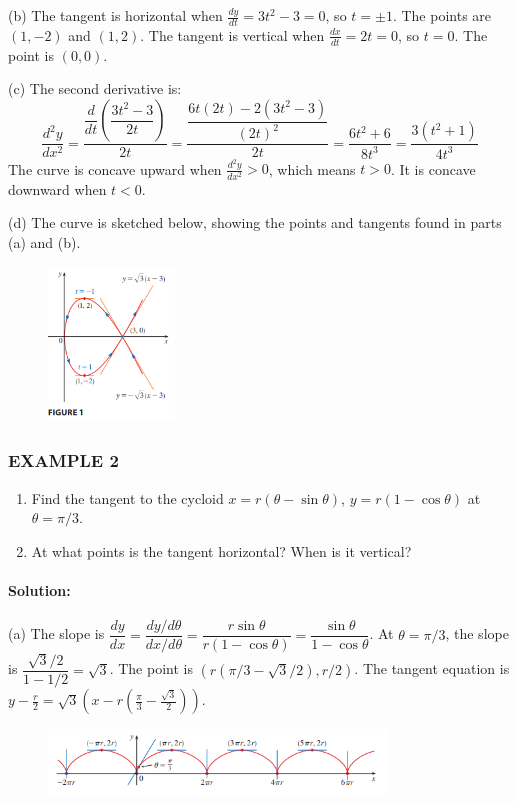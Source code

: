 \documentclass{article}
\begin{document}
(b) The tangent is horizontal when $\frac{dy}{dt} = 3t^2-3 = 0$, so $t=\pm 1$. The points are $(1,-2)$ and $(1,2)$. The tangent is vertical when $\frac{dx}{dt} = 2t = 0$, so $t=0$. The point is $(0,0)$.

(c) The second derivative is:
\[
\frac{d^2y}{dx^2} = \dfrac{\dfrac{d}{dt}\left(\dfrac{3t^2-3}{2t}\right)}{2t} = \frac{\dfrac{6t(2t) - 2(3t^2-3)}{(2t)^2}}{2t} = \frac{6t^2+6}{8t^3} = \frac{3(t^2+1)}{4t^3}
\]
The curve is concave upward when $\frac{d^2y}{dx^2} > 0$, which means $t > 0$. It is concave downward when $t < 0$.

(d) The curve is sketched below, showing the points and tangents found in parts (a) and (b).
\begin{figure}[htbp]
    \centering
    \includegraphics[width=0.3\textwidth]{graph27.png}
\end{figure}

\subsubsection*{EXAMPLE 2}
\begin{enumerate}
    \item[(a)] Find the tangent to the cycloid $x=r(\theta-\sin\theta)$, $y=r(1-\cos\theta)$ at $\theta=\pi/3$.
    \item[(b)] At what points is the tangent horizontal? When is it vertical?
\end{enumerate}
\paragraph{Solution:}
(a) The slope is $\dfrac{dy}{dx} = \dfrac{dy/d\theta}{dx/d\theta} = \dfrac{r\sin\theta}{r(1-\cos\theta)} = \dfrac{\sin\theta}{1-\cos\theta}$. At $\theta=\pi/3$, the slope is $\dfrac{\sqrt{3}/2}{1-1/2} = \sqrt{3}$. The point is $(r(\pi/3 - \sqrt{3}/2), r/2)$. The tangent equation is $y - \frac{r}{2} = \sqrt{3}\left(x - r\left(\frac{\pi}{3} - \frac{\sqrt{3}}{2}\right)\right)$.
\begin{figure}[htbp]
    \centering
    \includegraphics[width=0.8\textwidth]{graph28.png}
\end{figure}
\end{document}
